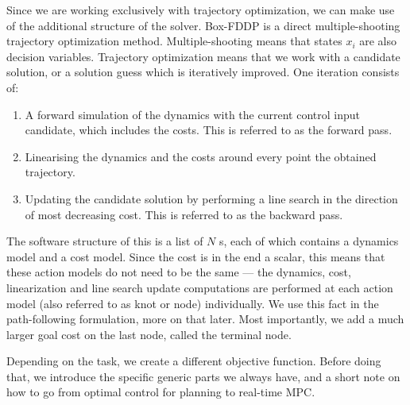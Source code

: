 Since we are working exclusively with trajectory optimization,
we can make use of the additional structure of the solver.
Box-FDDP is a direct multiple-shooting trajectory optimization method.
Multiple-shooting means that states $ x_{ i }  $ are
also decision variables.
Trajectory optimization means that we work with a candidate solution,
or a solution guess which is iteratively improved. One iteration consists
of:
\begin{enumerate}
		\item A forward simulation of the dynamics with the current control input candidate,
				which includes the costs. This is referred to as the forward pass.
		\item Linearising the dynamics and the costs around every point the obtained trajectory.
		\item Updating the candidate solution by performing a line search in the direction
				of most decreasing cost. This is referred to as the backward pass.
\end{enumerate}
The software structure of this is a list of $ N  $ s,
each of which contains a dynamics model and a cost model.
Since the cost is in the end a scalar, this means that these action models
do not need to be the same --- the dynamics, cost, linearization and line search update computations
are performed at each action model (also referred to as knot or node) individually.
We use this fact in the path-following formulation, more on that later.
Most importantly, we add a much larger goal cost on the last node,
called the terminal node.


Depending on the task, we create a different objective function.
Before doing that, we introduce the specific generic 
parts we always have, and a short note on how
to go from optimal control for planning to real-time MPC.


